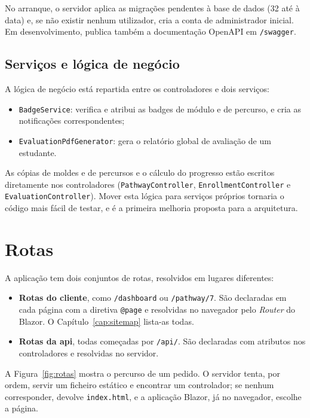 No arranque, o servidor aplica as migrações pendentes à base de dados (32 até à data) e, se não existir nenhum utilizador, cria a conta de administrador inicial. Em desenvolvimento, publica também a documentação OpenAPI em \texttt{/swagger}.

\subsection{Serviços e lógica de negócio}

A lógica de negócio está repartida entre os controladores e dois serviços:

\begin{itemize}
    \item \texttt{BadgeService}: verifica e atribui as badges de módulo e de percurso, e cria as notificações correspondentes;
    \item \texttt{EvaluationPdfGenerator}: gera o relatório global de avaliação de um estudante.
\end{itemize}

As cópias de moldes e de percursos e o cálculo do progresso estão escritos diretamente nos controladores (\texttt{PathwayController}, \texttt{EnrollmentController} e \texttt{EvaluationController}). Mover esta lógica para serviços próprios tornaria o código mais fácil de testar, e é a primeira melhoria proposta para a arquitetura.

\section{Rotas}
\label{sec:rotas}

A aplicação tem dois conjuntos de rotas, resolvidos em lugares diferentes:

\begin{itemize}
    \item \textbf{Rotas do cliente}, como \texttt{/dashboard} ou \texttt{/pathway/7}. São declaradas em cada página com a diretiva \texttt{@page} e resolvidas no navegador pelo \emph{Router} do Blazor. O Capítulo~\ref{cap:sitemap} lista-as todas.
    \item \textbf{Rotas da \gls{api}}, todas começadas por \texttt{/api/}. São declaradas com atributos nos controladores e resolvidas no servidor.
\end{itemize}

A Figura~\ref{fig:rotas} mostra o percurso de um pedido. O servidor tenta, por ordem, servir um ficheiro estático e encontrar um controlador; se nenhum corresponder, devolve \texttt{index.html}, e a aplicação Blazor, já no navegador, escolhe a página.

